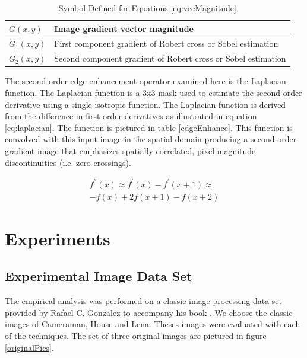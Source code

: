 \documentclass[journal]{IEEEtran}
\begin{document}
\begin{table}[h]
 \centering
 \begin{tabular}{|l|l|}
  \hline
  \(G(x,y)\) & Image gradient vector magnitude \\ \hline
  \(G_1(x,y)\) & First component gradient of Robert cross or Sobel estimation\\ \hline
  \(G_2(x,y)\) & Second component gradient of Robert cross or Sobel estimation\\ \hline
 \end{tabular}
 \caption{Symbol Defined for Equations \ref{eq:vecMagnitude}}
 \label{tab:vecMagnitudeTable}
\end{table}

\par The second-order edge enhancement operator examined here is the Laplacian function. The Laplacian function is a 3x3 mask used to estimate the second-order derivative using a single isotropic function. The Laplacian function is derived from the difference in first order derivatives as illustrated in equation \ref{eq:laplacian}. The function is pictured in table \ref{edgeEnhance}. This function is convolved with this input image in the spatial domain producing a second-order gradient image that emphasizes spatially correlated, pixel magnitude discontinuities (i.e. zero-crossings). \cite[p.~137-139]{Nixon}

\begin{multline} \label{eq:laplacian}
f^{''}(x) \approx f^{'}(x) - f^{'}(x+1) \approx \\ -f(x) + 2f(x+1) - f(x+2)
\end{multline}


\section{Experiments}

\subsection{Experimental Image Data Set}
\par The empirical analysis was performed on a classic image processing data set provided by Rafael C. Gonzalez to accompany his book \cite{Gonzalez}. We choose the classic images of Cameraman, House and Lena. Theses images were evaluated with each of the techniques. The set of three original images are pictured in figure \ref{originalPics}.
\end{document}
